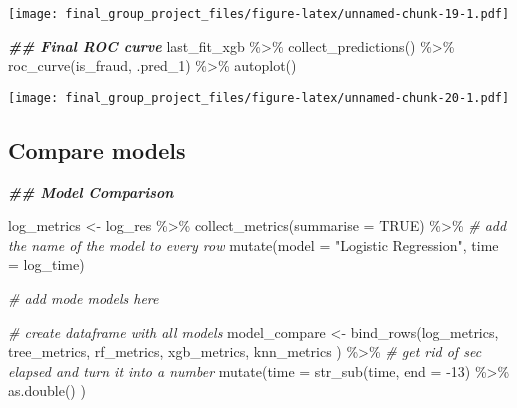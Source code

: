 \documentclass[
]{article}
\newenvironment{Shaded}{\begin{snugshade}}{\end{snugshade}}
\newcommand{\AttributeTok}[1]{\textcolor[rgb]{0.77,0.63,0.00}{#1}}
\newcommand{\CommentTok}[1]{\textcolor[rgb]{0.56,0.35,0.01}{\textit{#1}}}
\newcommand{\ConstantTok}[1]{\textcolor[rgb]{0.00,0.00,0.00}{#1}}
\newcommand{\DecValTok}[1]{\textcolor[rgb]{0.00,0.00,0.81}{#1}}
\newcommand{\DocumentationTok}[1]{\textcolor[rgb]{0.56,0.35,0.01}{\textbf{\textit{#1}}}}
\newcommand{\FunctionTok}[1]{\textcolor[rgb]{0.00,0.00,0.00}{#1}}
\newcommand{\NormalTok}[1]{#1}
\newcommand{\OtherTok}[1]{\textcolor[rgb]{0.56,0.35,0.01}{#1}}
\newcommand{\SpecialCharTok}[1]{\textcolor[rgb]{0.00,0.00,0.00}{#1}}
\newcommand{\StringTok}[1]{\textcolor[rgb]{0.31,0.60,0.02}{#1}}
\begin{document}
\texttt{[image: final\_group\_project\_files/figure-latex/unnamed-chunk-19-1.pdf]}

\begin{Shaded}
\begin{Highlighting}[]
\DocumentationTok{\#\# Final ROC curve}
\NormalTok{last\_fit\_xgb }\SpecialCharTok{\%\textgreater{}\%} 
  \FunctionTok{collect\_predictions}\NormalTok{() }\SpecialCharTok{\%\textgreater{}\%} 
  \FunctionTok{roc\_curve}\NormalTok{(is\_fraud, .pred\_1) }\SpecialCharTok{\%\textgreater{}\%}
  \FunctionTok{autoplot}\NormalTok{()}
\end{Highlighting}
\end{Shaded}

\texttt{[image: final\_group\_project\_files/figure-latex/unnamed-chunk-20-1.pdf]}

\hypertarget{compare-models}{%
\subsection{Compare models}\label{compare-models}}

\begin{Shaded}
\begin{Highlighting}[]
\DocumentationTok{\#\# Model Comparison}

\NormalTok{log\_metrics }\OtherTok{\textless{}{-}} 
\NormalTok{  log\_res }\SpecialCharTok{\%\textgreater{}\%} 
  \FunctionTok{collect\_metrics}\NormalTok{(}\AttributeTok{summarise =} \ConstantTok{TRUE}\NormalTok{) }\SpecialCharTok{\%\textgreater{}\%}
  \CommentTok{\# add the name of the model to every row}
  \FunctionTok{mutate}\NormalTok{(}\AttributeTok{model =} \StringTok{"Logistic Regression"}\NormalTok{,}
         \AttributeTok{time =}\NormalTok{ log\_time)}

\CommentTok{\# add mode models here}

\CommentTok{\# create dataframe with all models}
\NormalTok{model\_compare }\OtherTok{\textless{}{-}} \FunctionTok{bind\_rows}\NormalTok{(log\_metrics,}
\NormalTok{                            tree\_metrics,}
\NormalTok{                            rf\_metrics,}
\NormalTok{                           xgb\_metrics,}
\NormalTok{                           knn\_metrics}
\NormalTok{                      ) }\SpecialCharTok{\%\textgreater{}\%} 
  \CommentTok{\# get rid of \textquotesingle{}sec elapsed\textquotesingle{} and turn it into a number}
  \FunctionTok{mutate}\NormalTok{(}\AttributeTok{time =} \FunctionTok{str\_sub}\NormalTok{(time, }\AttributeTok{end =} \SpecialCharTok{{-}}\DecValTok{13}\NormalTok{) }\SpecialCharTok{\%\textgreater{}\%} 
           \FunctionTok{as.double}\NormalTok{()}
\NormalTok{         )}
\end{Highlighting}
\end{Shaded}
\end{document}
